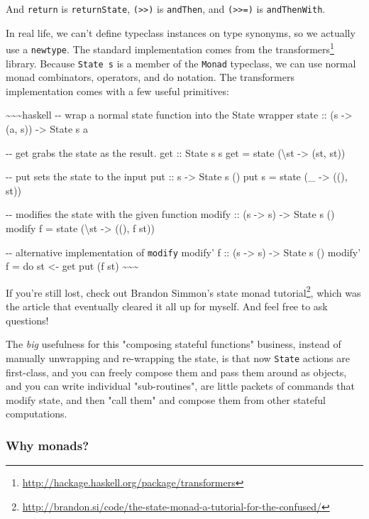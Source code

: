 \documentclass[]{article}
\renewcommand{\href}[2]{#2\footnote{\url{#1}}}
\begin{document}
And \texttt{return} is \texttt{returnState},
\texttt{(\textgreater{}\textgreater{})} is \texttt{andThen}, and
\texttt{(\textgreater{}\textgreater{}=)} is \texttt{andThenWith}.

In real life, we can't define typeclass instances on type synonyms, so we
actually use a \texttt{newtype}. The standard implementation comes from the
\href{http://hackage.haskell.org/package/transformers}{transformers} library.
Because \texttt{State\ s} is a member of the \texttt{Monad} typeclass, we can
use normal monad combinators, operators, and do notation. The transformers
implementation comes with a few useful primitives:

\textasciitilde{}\textasciitilde{}\textasciitilde{}haskell -\/- wrap a normal
state function into the State wrapper state :: (s -\textgreater{} (a, s))
-\textgreater{} State s a

-\/- get grabs the state as the result. get :: State s s get = state
(\textbackslash{}st -\textgreater{} (st, st))

-\/- put sets the state to the input put :: s -\textgreater{} State s () put s =
state (\_ -\textgreater{} ((), st))

-\/- modifies the state with the given function modify :: (s -\textgreater{} s)
-\textgreater{} State s () modify f = state (\textbackslash{}st -\textgreater{}
((), f st))

-\/- alternative implementation of \texttt{modify} modify' f :: (s
-\textgreater{} s) -\textgreater{} State s () modify' f = do st \textless{}- get
put (f st) \textasciitilde{}\textasciitilde{}\textasciitilde{}

If you're still lost, check out Brandon Simmon's
\href{http://brandon.si/code/the-state-monad-a-tutorial-for-the-confused/}{state
monad tutorial}, which was the article that eventually cleared it all up for
myself. And feel free to ask questions!

The \emph{big} usefulness for this "composing stateful functions" business,
instead of manually unwrapping and re-wrapping the state, is that now
\texttt{State} actions are first-class, and you can freely compose them and pass
them around as objects, and you can write individual "sub-routines", are little
packets of commands that modify state, and then "call them" and compose them
from other stateful computations.

\subsubsection{Why monads?}
\end{document}

